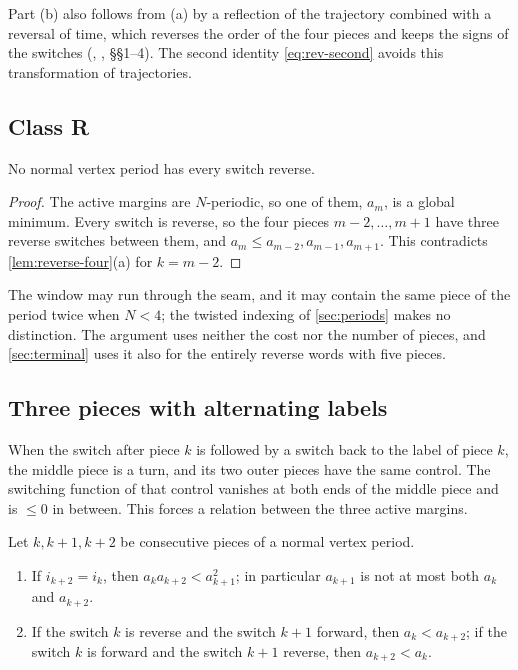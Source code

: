 Part (b) also follows from (a) by a reflection of the trajectory combined with a reversal of
time, which reverses the order of the four pieces and keeps the signs of the switches
(\cite{Notes}, , \S\S1--4). The second identity
\eqref{eq:rev-second} avoids this transformation of trajectories.

\subsection{Class R}\label{sec:rev-R}

\begin{theorem}\label{thm:class-R}
No normal vertex period has every switch reverse.
\end{theorem}

\begin{proof}
The active margins are $N$-periodic, so one of them, $a_m$, is a global minimum. Every switch is
reverse, so the four pieces $m-2,\dots,m+1$ have three reverse switches between them, and
$a_m\le a_{m-2},a_{m-1},a_{m+1}$. This contradicts \cref{lem:reverse-four}(a) for $k=m-2$.
\end{proof}

The window may run through the seam, and it may contain the same piece of the period twice when
$N<4$; the twisted indexing of \cref{sec:periods} makes no distinction. The argument uses neither
the cost nor the number of pieces, and \cref{sec:terminal} uses it also for the entirely reverse
words with five pieces.

\subsection{Three pieces with alternating labels}\label{sec:rev-three}

When the switch after piece $k$ is followed by a switch back to the label of piece $k$, the
middle piece is a turn, and its two outer pieces have the same control. The switching function
of that control vanishes at both ends of the middle piece and is $\le0$ in between. This forces
a relation between the three active margins.

\begin{lemma}\label{lem:three-arc}
Let $k,k+1,k+2$ be consecutive pieces of a normal vertex period.
\begin{enumerate}[label=\textup{(\alph*)}]
\item If $i_{k+2}=i_k$, then $a_ka_{k+2}<a_{k+1}^2$; in particular $a_{k+1}$ is not at most both
  $a_k$ and $a_{k+2}$.
\item If the switch $k$ is reverse and the switch $k+1$ forward, then $a_k<a_{k+2}$; if the switch
  $k$ is forward and the switch $k+1$ reverse, then $a_{k+2}<a_k$.
\end{enumerate}
\end{lemma}

